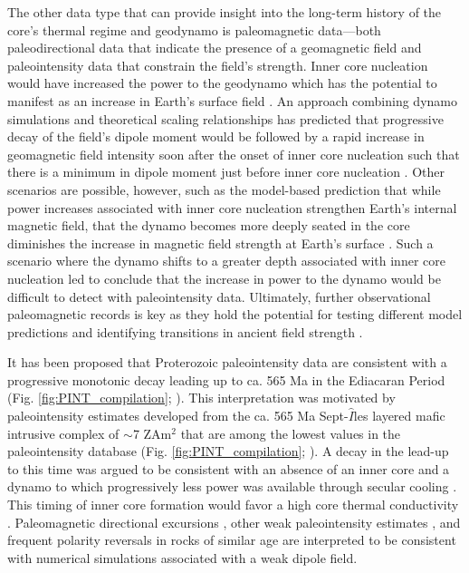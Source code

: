 \documentclass[9pt,twocolumn,twoside,lineno]{pnas-new}
\begin{document}
The other data type that can provide insight into the long-term history of the core's thermal regime and geodynamo is paleomagnetic data---both paleodirectional data that indicate the presence of a geomagnetic field and paleointensity data that constrain the field's strength. Inner core nucleation would have increased the power to the geodynamo which has the potential to manifest as an increase in Earth's surface field \cite{Davies2021a}. An approach combining dynamo simulations and theoretical scaling relationships has predicted that progressive decay of the field's dipole moment would be followed by a rapid increase in geomagnetic field intensity soon after the onset of inner core nucleation such that there is a minimum in dipole moment just before inner core nucleation \cite{Davies2021a}. Other scenarios are possible, however, such as the model-based prediction that while power increases associated with inner core nucleation strengthen Earth's internal magnetic field, that the dynamo becomes more deeply seated in the core diminishes the increase in magnetic field strength at Earth's surface \cite{Aubert2009a, Landeau2017a}. Such a scenario where the dynamo shifts to a greater depth associated with inner core nucleation led \cite{Aubert2009a} to conclude that the increase in power to the dynamo would be difficult to detect with paleointensity data. Ultimately, further observational paleomagnetic records is key as they hold the potential for testing different model predictions and identifying transitions in ancient field strength \cite{Biggin2015a, Bono2019a}.

It has been proposed that Proterozoic paleointensity data are consistent with a progressive monotonic decay leading up to ca. 565 Ma in the Ediacaran Period (Fig. \ref{fig:PINT_compilation}; \citealp{Bono2019a}). This interpretation was motivated by paleointensity estimates developed from the ca. 565 Ma Sept-$\hat{I}$les layered mafic intrusive complex of $\sim$7 ZAm$^2$ that are among the lowest values in the paleointensity database (Fig. \ref{fig:PINT_compilation}; \citealp{Bono2019a}). A decay in the lead-up to this time was argued to be consistent with an absence of an inner core and a dynamo to which progressively less power was available through secular cooling \cite{Bono2019a, Davies2021a}. This timing of inner core formation would favor a high core thermal conductivity \cite[e.g.][]{Ohta2016a}. Paleomagnetic directional excursions \cite{Halls2015a}, other weak paleointensity estimates \cite{Thallner2021b}, and frequent polarity reversals \cite{Kodama2021a} in rocks of similar age are interpreted to be consistent with numerical simulations \cite{Driscoll2016a} associated with a weak dipole field. 
\end{document}
